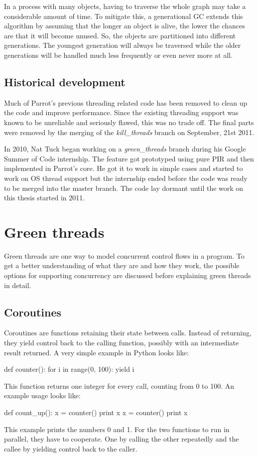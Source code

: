 \documentclass[bachelor,english]{hgbthesis}
\begin{document}
In a process with many objects, having to traverse the whole graph may take a considerable amount of time. To mitigate this, a generational GC extends this algorithm by assuming that the longer an object is alive, the lower the chances are that it will become unused. So, the objects are partitioned into different generations. The youngest generation will always be traversed while the older generations will be handled much less frequently or even never more at all.

\section{Historical development}

Much of Parrot's previous threading related code has been removed to clean up the code and improve performance. Since the existing threading support was known to be unreliable and seriously flawed, this was no trade off. The final parts were removed by the merging of the \textit{kill\_threads} branch on September, 21st 2011.

In 2010, Nat Tuck began working on a \textit{green\_threads} branch during his Google Summer of Code internship. The feature got prototyped using pure PIR and then implemented in Parrot's core. He got it to work in simple cases and started to work on OS thread support but the internship ended before the code was ready to be merged into the master branch. The code lay dormant until the work on this thesis started in 2011.

\chapter{Green threads}
\label{cha:green_threads}

Green threads are one way to model concurrent control flows in a program. To get a better understanding of what they are and how they work, the possible options for supporting concurrency are discussed before explaining green threads in detail.

\section{Coroutines}

Coroutines are functions retaining their state between calls. Instead of returning, they yield control back to the calling function, possibly with an intermediate result returned. A very simple example in Python looks like:
\begin{GenericCode}
def counter():
    for i in range(0, 100):
        yield i
\end{GenericCode}
This function returns one integer for every call, counting from 0 to 100. An example usage looks like:
\begin{GenericCode}
def count\_up():
    x = counter()
    print x
    x = counter()
    print x
\end{GenericCode}
This example prints the numbers 0 and 1. For the two functions to run in parallel, they have to cooperate. One by calling the other repeatedly and the callee by yielding control back to the caller.
\end{document}

